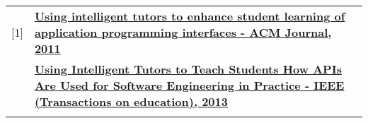 \documentclass[]{my-resume-openfont}
\begin{document}
\begin{minipage}[t]{0.66\textwidth}
\sectionsep
\begin{tabular}{p{0.3cm}p{11.6cm}}
[1]   & \textbf{\href{http://dl.acm.org/citation.cfm?id=2037190}{Using intelligent tutors to enhance student learning of application programming interfaces - ACM Journal, 2011}}\\ \relax
[2]   & \textbf{\href{http://ieeexplore.ieee.org/xpl/articleDetails.jsp?reload=true\&arnumber=6422340}{Using Intelligent Tutors to Teach Students How APIs Are Used for Software Engineering in Practice - IEEE (Transactions on education), 2013}}\\ \relax
\end{tabular}
\sectionsep

\end{minipage} 
\end{document}
